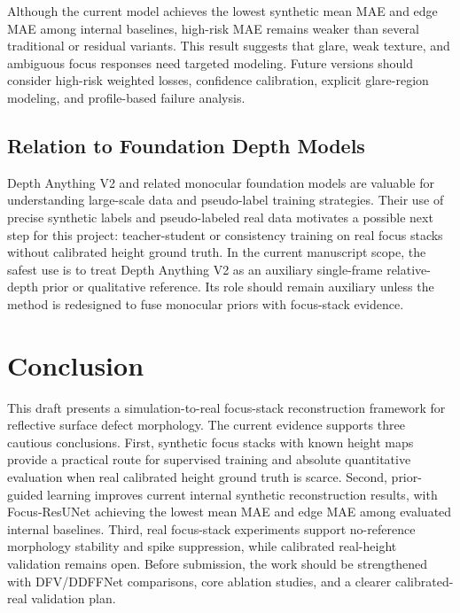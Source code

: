 \documentclass[11pt,a4paper]{article}
\begin{document}
Although the current model achieves the lowest synthetic mean MAE and edge MAE among internal baselines, high-risk MAE remains weaker than several traditional or residual variants. This result suggests that glare, weak texture, and ambiguous focus responses need targeted modeling. Future versions should consider high-risk weighted losses, confidence calibration, explicit glare-region modeling, and profile-based failure analysis.

\subsection{Relation to Foundation Depth Models}

Depth Anything V2 and related monocular foundation models are valuable for understanding large-scale data and pseudo-label training strategies. Their use of precise synthetic labels and pseudo-labeled real data motivates a possible next step for this project: teacher-student or consistency training on real focus stacks without calibrated height ground truth. In the current manuscript scope, the safest use is to treat Depth Anything V2 as an auxiliary single-frame relative-depth prior or qualitative reference. Its role should remain auxiliary unless the method is redesigned to fuse monocular priors with focus-stack evidence.

\section{Conclusion}

This draft presents a simulation-to-real focus-stack reconstruction framework for reflective surface defect morphology. The current evidence supports three cautious conclusions. First, synthetic focus stacks with known height maps provide a practical route for supervised training and absolute quantitative evaluation when real calibrated height ground truth is scarce. Second, prior-guided learning improves current internal synthetic reconstruction results, with Focus-ResUNet achieving the lowest mean MAE and edge MAE among evaluated internal baselines. Third, real focus-stack experiments support no-reference morphology stability and spike suppression, while calibrated real-height validation remains open. Before submission, the work should be strengthened with DFV/DDFFNet comparisons, core ablation studies, and a clearer calibrated-real validation plan.



\end{document}
